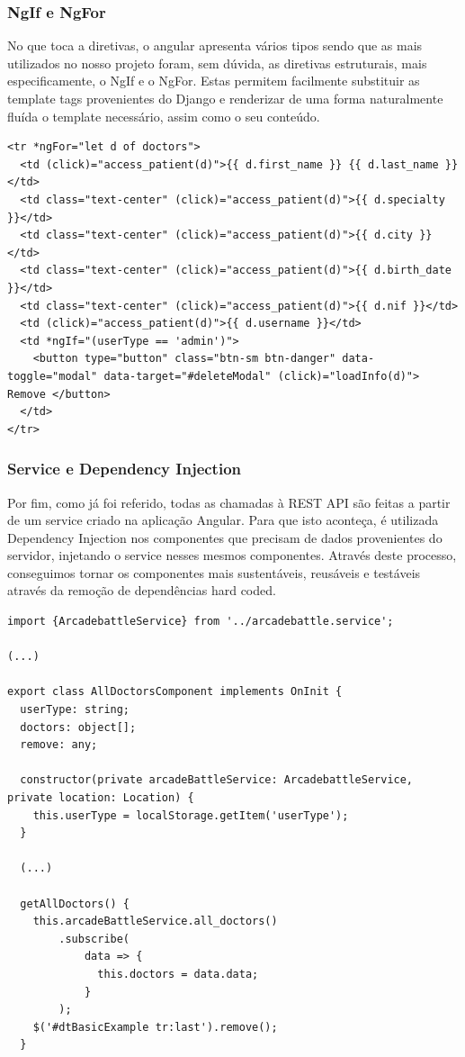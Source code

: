 \documentclass[12pt]{article}
\begin{document}
\subsubsection{NgIf e NgFor}
No que toca a diretivas, o angular apresenta vários tipos sendo que as mais utilizados no nosso projeto foram, sem dúvida, as diretivas estruturais, mais especificamente, o NgIf e o NgFor. Estas permitem facilmente substituir as template tags provenientes do Django e renderizar de uma forma naturalmente fluída o template necessário, assim como o seu conteúdo.

\vspace{8mm}

\begin{lstlisting}[caption={Listagem de todos os médicos na plataforma},captionpos=b]
<tr *ngFor="let d of doctors">
  <td (click)="access_patient(d)">{{ d.first_name }} {{ d.last_name }}</td>
  <td class="text-center" (click)="access_patient(d)">{{ d.specialty }}</td>
  <td class="text-center" (click)="access_patient(d)">{{ d.city }}</td>
  <td class="text-center" (click)="access_patient(d)">{{ d.birth_date }}</td>
  <td class="text-center" (click)="access_patient(d)">{{ d.nif }}</td>
  <td (click)="access_patient(d)">{{ d.username }}</td>
  <td *ngIf="(userType == 'admin')">
    <button type="button" class="btn-sm btn-danger" data-toggle="modal" data-target="#deleteModal" (click)="loadInfo(d)"> Remove </button>
  </td>
</tr>
\end{lstlisting}
\clearpage

\subsubsection{Service e Dependency Injection}
Por fim, como já foi referido, todas as chamadas à REST API são feitas a partir de um service criado na aplicação Angular. Para que isto aconteça, é utilizada Dependency Injection nos componentes que precisam de dados provenientes do servidor, injetando o service nesses mesmos componentes. Através deste processo, conseguimos tornar os componentes mais sustentáveis, reusáveis e testáveis através da remoção de dependências hard coded.

\vspace{8mm}

\begin{lstlisting}[caption={Injeção de um serviço e uso posterior do mesmo},captionpos=b]
import {ArcadebattleService} from '../arcadebattle.service';

(...)

export class AllDoctorsComponent implements OnInit {
  userType: string;
  doctors: object[];
  remove: any;

  constructor(private arcadeBattleService: ArcadebattleService, private location: Location) {
    this.userType = localStorage.getItem('userType');
  }
  
  (...)
  
  getAllDoctors() {
    this.arcadeBattleService.all_doctors()
        .subscribe(
            data => {
              this.doctors = data.data;
            }
        );
    $('#dtBasicExample tr:last').remove();
  }
\end{lstlisting}
\clearpage
\end{document}
